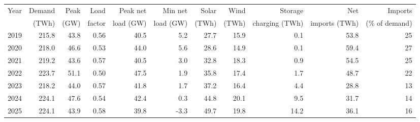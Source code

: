 \begin{tabular}{lrrrrrrrrrr}
\toprule
Year & Demand & Peak & Load & Peak net & Min net & Solar & Wind & Storage & Net & Imports \\
 & (TWh) & (GW) & factor & load (GW) & load (GW) & (TWh) & (TWh) & charging (TWh) & imports (TWh) & (\% of demand) \\
\midrule
2019 & 215.8 & 43.8 & 0.56 & 40.5 & 5.2 & 27.7 & 15.9 & 0.1 & 53.8 & 25 \\
2020 & 218.0 & 46.6 & 0.53 & 44.0 & 5.6 & 28.6 & 14.9 & 0.1 & 59.4 & 27 \\
2021 & 219.2 & 43.6 & 0.57 & 40.5 & 3.0 & 32.8 & 18.3 & 0.9 & 54.5 & 25 \\
2022 & 223.7 & 51.1 & 0.50 & 47.5 & 1.9 & 35.8 & 17.4 & 1.7 & 48.7 & 22 \\
2023 & 218.2 & 44.0 & 0.57 & 41.8 & 1.7 & 37.2 & 16.4 & 4.4 & 28.8 & 13 \\
2024 & 224.1 & 47.6 & 0.54 & 42.4 & 0.3 & 44.8 & 20.1 & 9.5 & 31.7 & 14 \\
2025 & 224.1 & 43.9 & 0.58 & 39.8 & -3.3 & 49.7 & 19.8 & 14.2 & 36.1 & 16 \\
\bottomrule
\end{tabular}